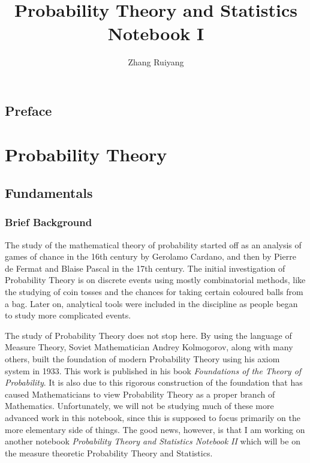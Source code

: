 \documentclass[11pt, a4paper, oneside]{book}
\theoremstyle{definition}
\begin{document}
\frontmatter 

\title{\huge Probability Theory and Statistics Notebook I}
\author{\Large{Zhang Ruiyang}}
\date{}
\maketitle

\tableofcontents

\newpage

\chapter*{Preface}

\mainmatter

\part{Probability Theory} 

\chapter{Fundamentals}

\section{Brief Background}

The study of the mathematical theory of probability started off as an analysis of games of chance in the 16th century by Gerolamo Cardano, and then by Pierre de Fermat and Blaise Pascal in the 17th century. The initial investigation of Probability Theory is on discrete events using mostly combinatorial methods, like the studying of coin tosses and the chances for taking certain coloured balls from a bag. Later on, analytical tools were included in the discipline as people began to study more complicated events.

\noindent The study of Probability Theory does not stop here. By using the language of Measure Theory, Soviet Mathematician Andrey Kolmogorov, along with many others, built the foundation of modern Probability Theory using his axiom system in 1933. This work is published in his book \emph{Foundations of the Theory of Probability}. It is also due to this rigorous construction of the foundation that has caused Mathematicians to view Probability Theory as a proper branch of Mathematics. Unfortunately, we will not be studying much of these more advanced work in this notebook, since this is supposed to focus primarily on the more elementary side of things. The good news, however, is that I am working on another notebook \emph{Probability Theory and Statistics Notebook II} which will be on the measure theoretic Probability Theory and Statistics. 
\end{document}
